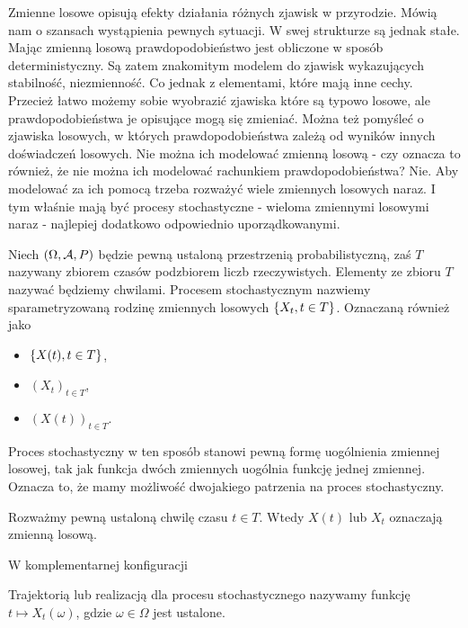 \documentclass[10pt,a4paper]{book}
\begin{document}
Zmienne losowe opisują efekty działania różnych zjawisk w przyrodzie. Mówią nam o szansach wystąpienia pewnych sytuacji. W swej strukturze są jednak stałe. Mając zmienną losową prawdopodobieństwo jest obliczone w sposób deterministyczny. Są zatem znakomitym modelem do zjawisk wykazujących stabilność, niezmienność. Co jednak z elementami, które mają inne cechy. Przecież łatwo możemy sobie wyobrazić zjawiska które są typowo losowe, ale prawdopodobieństwa je opisujące mogą się zmieniać. Można też pomyśleć o zjawiska losowych, w których prawdopodobieństwa zależą od wyników innych doświadczeń losowych. Nie można ich modelować zmienną losową - czy oznacza to również, że nie można ich modelować rachunkiem prawdopodobieństwa? Nie. Aby modelować za ich pomocą trzeba rozważyć wiele zmiennych losowych naraz. I tym właśnie mają być procesy stochastyczne - wieloma zmiennymi losowymi naraz - najlepiej dodatkowo odpowiednio uporządkowanymi.

\begin{definition}
Niech $(\Omega, \mathcal{A}, P)$ będzie pewną ustaloną przestrzenią probabilistyczną, zaś $T$ nazywany zbiorem czasów podzbiorem liczb rzeczywistych. Elementy ze zbioru $T$ nazywać będziemy chwilami. 
Procesem stochastycznym nazwiemy sparametryzowaną rodzinę zmiennych losowych $\left\lbrace {{X_t}, {t \in T}} \right\rbrace$. Oznaczaną również jako 
\begin{itemize}
\item $\left\lbrace {X(t), t \in T} \right\rbrace$,
\item $(X_t)_{t \in T}$,
\item $(X(t))_{t \in T}$.
\end{itemize}
\end{definition}

Proces stochastyczny w ten sposób stanowi pewną formę uogólnienia zmiennej losowej, tak jak funkcja dwóch zmiennych uogólnia funkcję jednej zmiennej.
Oznacza to, że mamy możliwość dwojakiego patrzenia na proces stochastyczny.

\begin{remark*}
Rozważmy pewną ustaloną chwilę czasu $t \in T$. Wtedy $X(t)$ lub $X_t$ oznaczają zmienną losową. 
\end{remark*}

W komplementarnej konfiguracji

\begin{definition}
Trajektorią lub realizacją dla procesu stochastycznego nazywamy funkcję $t \mapsto X_t(\omega)$, gdzie $\omega \in \Omega$ jest ustalone.
\end{definition}
\end{document}
